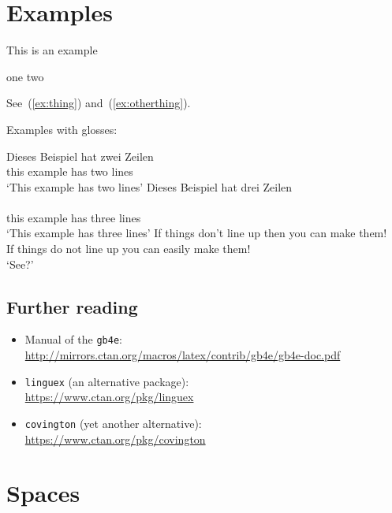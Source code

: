 \documentclass{scrartcl}
\begin{document}
\section{Examples}

\begin{exe}
  \ex This is an example
  \begin{xlist}
    \ex\label{ex:otherthing} one
    \ex two
  \end{xlist}
\end{exe}

See~(\ref{ex:thing}) and~(\ref{ex:otherthing}).

Examples with glosses:

\begin{exe}
  \ex \gll Dieses Beispiel hat zwei Zeilen \\
    this example has two lines \\
    \trans `This example has two lines'
  \ex \glll Dieses Beispiel hat drei Zeilen \\
         \\
    this example has three lines \\
    \trans `This example has three lines'
  \ex \gll If things don't line up then you can {} make them! \\
    If things {do not} line up {} you can easily make them! \\
    \trans `See?'
\end{exe}

\subsection*{Further reading}
\begin{itemize}
  \item Manual of the \texttt{gb4e}: \\
    \url{http://mirrors.ctan.org/macros/latex/contrib/gb4e/gb4e-doc.pdf}
  \item \texttt{linguex} (an alternative package): \\
    \url{https://www.ctan.org/pkg/linguex}
  \item \texttt{covington} (yet another alternative): \\
    \url{https://www.ctan.org/pkg/covington}
\end{itemize}

\section{Spaces}
\end{document}

